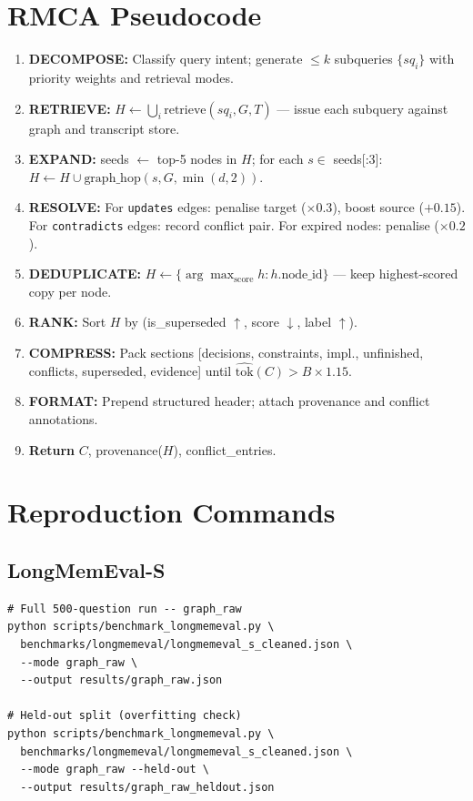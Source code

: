 \documentclass[conference]{IEEEtran}
\begin{document}
\appendix

\section{RMCA Pseudocode}

\begin{enumerate}
\item \textbf{DECOMPOSE:} Classify query intent; generate $\leq k$ subqueries $\{sq_i\}$ with priority weights and retrieval modes.
\item \textbf{RETRIEVE:} $H \leftarrow \bigcup_i \text{retrieve}(sq_i, G, T)$ --- issue each subquery against graph and transcript store.
\item \textbf{EXPAND:} seeds $\leftarrow$ top-5 nodes in $H$; for each $s \in$ seeds[:3]: $H \leftarrow H \cup \text{graph\_hop}(s, G, \min(d,2))$.
\item \textbf{RESOLVE:} For \texttt{updates} edges: penalise target ($\times 0.3$), boost source ($+0.15$). For \texttt{contradicts} edges: record conflict pair. For expired nodes: penalise ($\times 0.2$).
\item \textbf{DEDUPLICATE:} $H \leftarrow \{\arg\max_{\text{score}} h : h.\text{node\_id}\}$ --- keep highest-scored copy per node.
\item \textbf{RANK:} Sort $H$ by (is\_superseded $\uparrow$, score $\downarrow$, label $\uparrow$).
\item \textbf{COMPRESS:} Pack sections [decisions, constraints, impl., unfinished, conflicts, superseded, evidence] until $\widehat{\text{tok}}(C) > B \times 1.15$.
\item \textbf{FORMAT:} Prepend structured header; attach provenance and conflict annotations.
\item[] \textbf{Return} $C$, provenance($H$), conflict\_entries.
\end{enumerate}

\section{Reproduction Commands}

\subsection{LongMemEval-S}

\begin{verbatim}
# Full 500-question run -- graph_raw
python scripts/benchmark_longmemeval.py \
  benchmarks/longmemeval/longmemeval_s_cleaned.json \
  --mode graph_raw \
  --output results/graph_raw.json

# Held-out split (overfitting check)
python scripts/benchmark_longmemeval.py \
  benchmarks/longmemeval/longmemeval_s_cleaned.json \
  --mode graph_raw --held-out \
  --output results/graph_raw_heldout.json
\end{verbatim}
\end{document}
